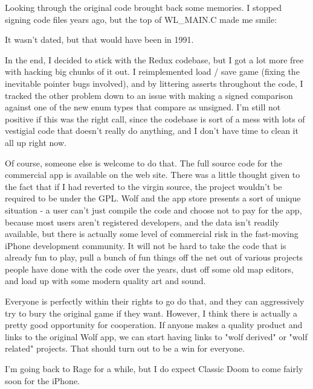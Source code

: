\documentclass[book.tex]{subfiles}
\begin{document}
Looking through the original code brought back some memories.  I stopped signing code files years ago, but the top of WL\_MAIN.C made me smile:\\
\par
\begin{minipage}{\textwidth}

\end{minipage}
\par
It wasn't dated, but that would have been in 1991.\\
\par

In the end, I decided to stick with the Redux codebase, but I got a lot more free with hacking big chunks of it out.  I reimplemented load / save game (fixing the inevitable pointer bugs involved), and by littering asserts throughout the code, I tracked the other problem down to an issue with making a signed comparison against one of the new enum types that compare as unsigned.  I'm still not positive if this was the right call, since the codebase is sort of a mess with lots of vestigial code that doesn't really do anything, and I don't have time to clean it all up right now.\\
\par

Of course, someone else is welcome to do that.  The full source code for the commercial app is available on the web site.  There was a little thought given to the fact that if I had reverted to the virgin source, the project wouldn't be required to be under the GPL.  Wolf and the app store presents a sort of unique situation - a user can't just compile the code and choose not to pay for the app, because most users aren't registered developers, and the data isn't readily available, but there is actually some level of commercial risk in the fast-moving iPhone development community.  It will not be hard to take the code that is already fun to play, pull a bunch of fun things off the net out of various projects people have done with the code over the years, dust off some old map editors, and load up with some modern quality art and sound.\\
\par

Everyone is perfectly within their rights to go do that, and they can aggressively try to bury the original game if they want.  However, I think there is actually a pretty good opportunity for cooperation.  If anyone makes a quality product and links to the original Wolf app, we can start having links to "wolf derived" or "wolf related" projects. That should turn out to be a win for everyone.\\
\par

I'm going back to Rage for a while, but I do expect Classic Doom to come fairly soon for the iPhone.\\
\par

 






 




 
\end{document}
